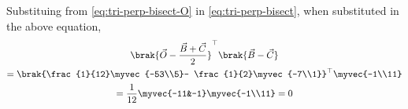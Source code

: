  \solution
Substituing  from 
			\eqref{eq:tri-perp-bisect-O} in 
			\eqref{eq:tri-perp-bisect},
when substituted in the above equation,
\begin{multline}
	\brak{\vec{O}-\frac{\vec{B}+\vec{C}}{2}}^{\top}\brak{\vec{B}-\vec{C}}\\
	=\brak{\frac{1}{12}\myvec{-53\\5}- \frac{1}{2}\myvec{-7\\1}}^{\top} \myvec{-1\\11}\\
	=\frac{1}{12}\myvec{-11&-1}\myvec{-1\\11}
	=0
\end{multline}



